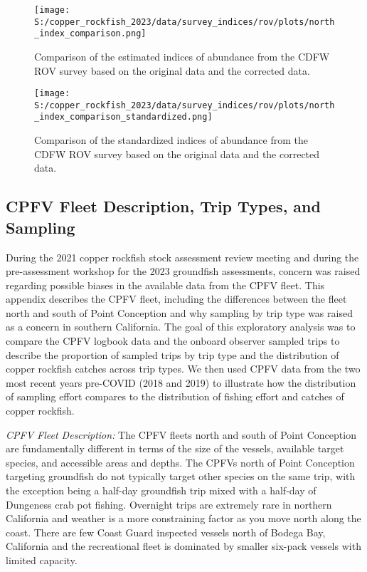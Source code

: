 \documentclass[11pt,
  english,
  letterpaper,
]{article}
\begin{document}
\begin{figure}
\centering
\texttt{[image: S:/copper\_rockfish\_2023/data/survey\_indices/rov/plots/north\_index\_comparison.png]}
\caption{Comparison of the estimated indices of abundance from the CDFW ROV survey based on the original data and the corrected data.\label{fig:rov-corrected-index}}
\end{figure}

\newpage

\begin{figure}
\centering
\texttt{[image: S:/copper\_rockfish\_2023/data/survey\_indices/rov/plots/north\_index\_comparison\_standardized.png]}
\caption{Comparison of the standardized indices of abundance from the CDFW ROV survey based on the original data and the corrected data.\label{fig:rov-corrected-index-stand}}
\end{figure}

\newpage

\hypertarget{cpfv-samples}{%
\subsection{CPFV Fleet Description, Trip Types, and Sampling}\label{cpfv-samples}}

During the 2021 copper rockfish stock assessment review meeting and during the pre-assessment workshop for the 2023 groundfish assessments, concern was raised regarding possible biases in the available data from the CPFV fleet. This appendix describes the CPFV fleet, including the differences between the fleet north and south of Point Conception and why sampling by trip type was raised as a concern in southern California. The goal of this exploratory analysis was to compare the CPFV logbook data and the onboard observer sampled trips to describe the proportion of sampled trips by trip type and the distribution of copper rockfish catches across trip types. We then used CPFV data from the two most recent years pre-COVID (2018 and 2019) to illustrate how the distribution of sampling effort compares to the distribution of fishing effort and catches of copper rockfish.

\emph{CPFV Fleet Description:} The CPFV fleets north and south of Point Conception are fundamentally different in terms of the size of the vessels, available target species, and accessible areas and depths. The CPFVs north of Point Conception targeting groundfish do not typically target other species on the same trip, with the exception being a half-day groundfish trip mixed with a half-day of Dungeness crab pot fishing. Overnight trips are extremely rare in northern California and weather is a more constraining factor as you move north along the coast. There are few Coast Guard inspected vessels north of Bodega Bay, California and the recreational fleet is dominated by smaller six-pack vessels with limited capacity.
\end{document}
